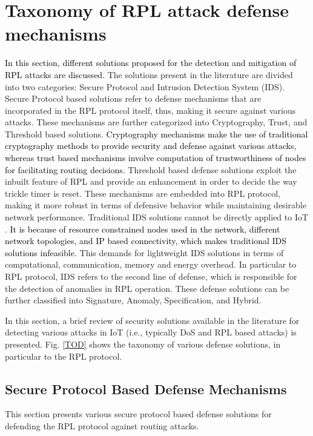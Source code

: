 \documentclass[10pt,journal,sort & compress]{IEEEtran}
\begin{document}
\section{Taxonomy of RPL attack defense mechanisms}\label{Taxonomy of RPL attack defense mechanisms}
\textcolor{black}{In this section, different solutions proposed for the detection and mitigation of RPL attacks are discussed.} The solutions present in the literature are divided into two categories: Secure Protocol and Intrusion Detection System (IDS). Secure Protocol based solutions refer to defense mechanisms that are incorporated in the RPL protocol itself, thus, making it secure against various attacks. 
These mechanisms are further categorized into Cryptography, Trust, and Threshold based solutions. \textcolor{black}{Cryptography mechanisms make the use of traditional cryptography methods to provide security and defense against various attacks, whereas trust based mechanisms involve computation of trustworthiness of nodes for facilitating routing decisions.} Threshold based defense solutions exploit the inbuilt feature of RPL and provide an enhancement in order to decide the way trickle timer is reset.  These mechanisms are embedded into RPL protocol, making it more robust in terms of defensive behavior while maintaining desirable network performance. Traditional IDS solutions cannot be directly applied to IoT \cite{Zarpelao2017}. \textcolor{black}{It is because of resource constrained nodes used in the network, different network topologies, and IP based connectivity, which makes traditional IDS solutions infeasible.} This demands for lightweight IDS solutions in terms of computational, communication, memory and energy overhead. In particular to RPL protocol, IDS refers to the second line of defense, which is responsible for the detection of anomalies in RPL operation. These defense solutions can be further classified into Signature, Anomaly, Specification, and Hybrid.

In this section, a brief review of security solutions available in the literature for detecting various attacks in IoT (i.e., typically DoS and RPL based attacks) is presented. Fig. \ref{TOD} shows the taxonomy of various defense solutions, in particular to the RPL protocol. 


\subsection{Secure Protocol Based Defense Mechanisms}
This section presents various secure protocol based defense solutions for defending the RPL protocol against routing attacks.      
\end{document}
